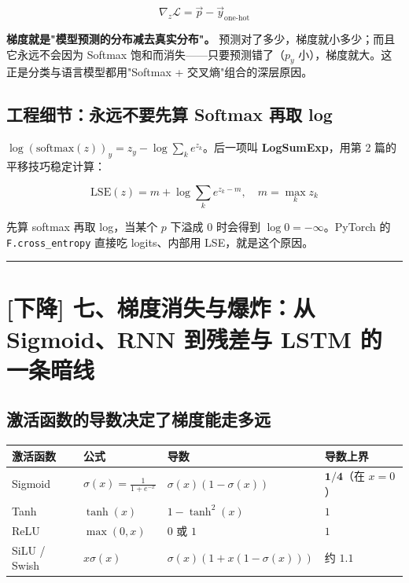 \[
\boxed{\ \nabla_z \mathcal{L} = \vec{p} - \vec{y}_{\text{one-hot}}\ }
\]

\textbf{梯度就是"模型预测的分布减去真实分布"。} 预测对了多少，梯度就小多少；而且它永远不会因为 Softmax 饱和而消失——只要预测错了（$p_y$ 小），梯度就大。这正是分类与语言模型都用"Softmax + 交叉熵"组合的深层原因。

\subsection{工程细节：永远不要先算 Softmax 再取 log}

$\log(\text{softmax}(z))_y = z_y - \log \sum_k e^{z_k}$。后一项叫 \textbf{LogSumExp}，用第 2 篇的平移技巧稳定计算：

\[
\text{LSE}(z) = m + \log \sum_k e^{z_k - m}, \quad m = \max_k z_k
\]

先算 softmax 再取 log，当某个 $p$ 下溢成 0 时会得到 $\log 0 = -\infty$。PyTorch 的 \texttt{F.cross\_entropy} 直接吃 logits、内部用 LSE，就是这个原因。

\vspace{0.8em}\hrule\vspace{0.8em}

\section{[下降] 七、梯度消失与爆炸：从 Sigmoid、RNN 到残差与 LSTM 的一条暗线}

\subsection{激活函数的导数决定了梯度能走多远}

\begin{center}
\small
\begin{tabularx}{\textwidth}{p{2.5cm} p{3.5cm} X X}
\toprule
\textbf{激活函数} & \textbf{公式} & \textbf{导数} & \textbf{导数上界} \\
\midrule
Sigmoid & $\sigma(x) = \frac{1}{1 + e^{-x}}$ & $\sigma(x)(1 - \sigma(x))$ & $\mathbf{1/4}$（在 $x=0$） \\
Tanh & $\tanh(x)$ & $1 - \tanh^2(x)$ & $1$ \\
ReLU & $\max(0, x)$ & $0$ 或 $1$ & $1$ \\
SiLU / Swish & $x \sigma(x)$ & $\sigma(x)(1 + x(1 - \sigma(x)))$ & 约 $1.1$ \\
\bottomrule
\end{tabularx}
\end{center}

